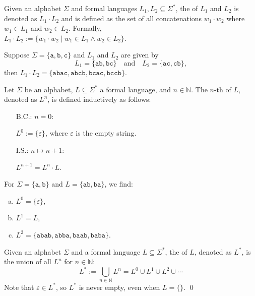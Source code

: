 \begin{Definition}
  Given an alphabet \( \Sigma \) and formal languages \( L_1, L_2 \subseteq \Sigma^* \), the  of \( L_1 \) and \( L_2 \) is denoted as \( L_1 \cdot L_2 \) and is defined as the set of all concatenations \( w_1 \cdot w_2 \) where \( w_1 \in L_1 \) and \( w_2 \in L_2 \). Formally, 
\\[0.2cm]
\hspace*{1.3cm}
$ L_1 \cdot L_2 := \{ w_1 \cdot w_2 \mid w_1 \in L_1 \land w_2 \in L_2 \}$. \eox 
\end{Definition}

\exampleEng
Suppose \( \Sigma = \{ \texttt{a}, \texttt{b}, \texttt{c} \} \) and \( L_1 \) and \( L_2 \) are given by
\[
L_1 = \{ \texttt{ab}, \texttt{bc} \} \quad \text{and} \quad L_2 = \{ \texttt{ac}, \texttt{cb} \},
\]
then \( L_1 \cdot L_2 = \{ \texttt{abac}, \texttt{abcb}, \texttt{bcac}, \texttt{bccb} \} \). \eox
\pagebreak

\begin{Definition}
Let \( \Sigma \) be an alphabet, \( L \subseteq \Sigma^* \) a formal language, and \( n \in \mathbb{N} \). The \( n \)-th  of \( L \), denoted as \( L^n \), is defined inductively as follows:
\begin{enumerate}
\item[B.C.:] \( n = 0 \):

             \( L^0 := \{ \varepsilon \} \), \quad where \( \varepsilon \) is the empty string.
\item[I.S.:] \( n \mapsto n + 1 \):
             
             \( L^{n+1} = L^n \cdot L \). \eox
\end{enumerate}
\end{Definition}

\exampleEng
For \( \Sigma = \{ \texttt{a}, \texttt{b} \} \) and \( L = \{ \texttt{ab}, \texttt{ba} \} \), we find:
\begin{enumerate}[(a)]
\item \( L^0 = \{ \varepsilon \} \),
\item \( L^1 = L \),
\item \( L^2 = \{ \texttt{abab}, \texttt{abba}, \texttt{baab}, \texttt{baba} \} \). \eox
\end{enumerate}

\begin{Definition}
  Given an alphabet \( \Sigma \) and a formal language \( L \subseteq \Sigma^* \), the  of \( L \), denoted as \( L^* \), is the union of all \( L^n \) for \( n \in \mathbb{N} \):
  \[
  L^* := \bigcup_{n \in \mathbb{N}} L^n = L^0 \cup L^1 \cup L^2 \cup \cdots
  \]
  Note that \( \varepsilon \in L^* \), so \( L^* \) is never empty, even when \( L = \{\} \). \qed
\end{Definition}

